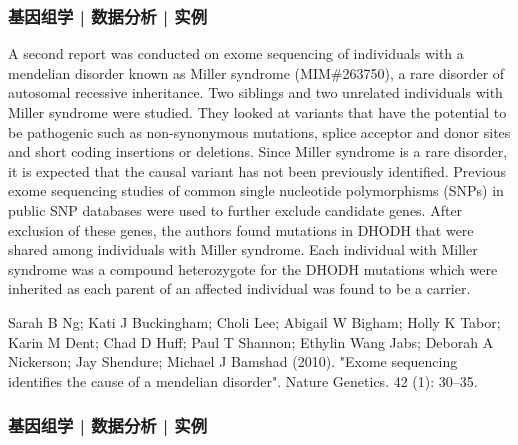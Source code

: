 \begin{frame}
  \frametitle{基因组学 | 数据分析 | 实例}
  A second report was conducted on exome sequencing of individuals with a mendelian disorder known as Miller syndrome (MIM\#263750), a rare disorder of autosomal recessive inheritance. Two siblings and two unrelated individuals with Miller syndrome were studied. They looked at variants that have the potential to be pathogenic such as non-synonymous mutations, splice acceptor and donor sites and short coding insertions or deletions. Since Miller syndrome is a rare disorder, it is expected that the causal variant has not been previously identified. Previous exome sequencing studies of common single nucleotide polymorphisms (SNPs) in public SNP databases were used to further exclude candidate genes. After exclusion of these genes, the authors found mutations in DHODH that were shared among individuals with Miller syndrome. Each individual with Miller syndrome was a compound heterozygote for the DHODH mutations which were inherited as each parent of an affected individual was found to be a carrier.

  Sarah B Ng; Kati J Buckingham; Choli Lee; Abigail W Bigham; Holly K Tabor; Karin M Dent; Chad D Huff; Paul T Shannon; Ethylin Wang Jabs; Deborah A Nickerson; Jay Shendure; Michael J Bamshad (2010). "Exome sequencing identifies the cause of a mendelian disorder". Nature Genetics. 42 (1): 30–35. 
\end{frame}

\begin{frame}
  \frametitle{基因组学 | 数据分析 | 实例}
\end{frame}

